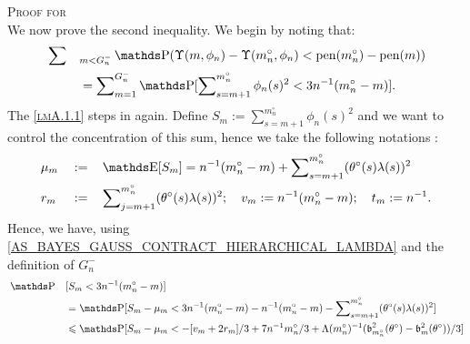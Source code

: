 \begin{pro}{\textsc{Proof for } \\}
We now prove the second inequality.
We begin by noting that:
\begin{alignat*}{2}
& \sum\nolimits&&_{m < G^{-}_{n}} \P(\Upsilon(m, \phi_{n}) - \Upsilon(m^{\circ}_{n}, \phi_{n}) < \pen(m^{\circ}_{n}) - \pen(m))\\
& && = \sum\nolimits_{m = 1}^{G_{n}^{-}} \P [\sum\nolimits_{s = m + 1}^{m_{n}^{\circ}} \phi_{n}(s)^{2} < 3 n^{-1} (m_{n}^{\circ} - m) ].
\end{alignat*}
The \textsc{\cref{lmA.1.1}} steps in again.
Define $S_{m} := \sum\nolimits_{s = m + 1}^{m_{n}^{\circ}} \phi_{n}(s)^{2}$ and we want to control the concentration of this sum, hence we take the following notations :
\begin{alignat*}{3}
& \mu_{m} &&:=&& \E[S_{m}] = n^{-1} (m_{n}^{\circ} - m) + \sum\nolimits_{s = m + 1}^{m_{n}^{\circ}}(\theta^{\circ}(s)\lambda(s))^{2}\\
&r_{m} &&:=&& \sum\nolimits_{j = m+1}^{m_{n}^{\circ}}(\theta^{\circ}(s)\lambda(s))^{2}; \quad v_{m} := n^{-1} (m_{n}^{\circ} - m); \quad t_{m} := n^{-1}.
\end{alignat*}
Hence, we have, using \textsc{\cref{AS_BAYES_GAUSS_CONTRACT_HIERARCHICAL_LAMBDA}} and the definition of $G_{n}^{-}$
\begin{alignat*}{2}
&\P&&[S_{m} < 3 n^{-1} (m_{n}^{\circ} - m)]\\
& && = \P[S_{m} - \mu_{m} < 3 n^{-1} (m_{n}^{\circ} - m) - n^{-1} (m_{n}^{\circ} - m) - \sum\nolimits_{s = m + 1}^{m_{n}^{\circ}}(\theta^{\circ}(s)\lambda(s))^{2}]\\
& && \leq \P[S_{m} - \mu_{m} <  - [v_{m} + 2 r_{m}]/3 + 7 n^{-1} m_{n}^{\circ}/3 + \Lambda(m_{n}^{\circ})^{-1} (\b_{m_{n}^{\circ}}^{2}(\theta^{\circ}) - \mathfrak{b}_{m}^{2}(\theta^{\circ})) / 3]\\

\end{alignat*}
\end{pro}
